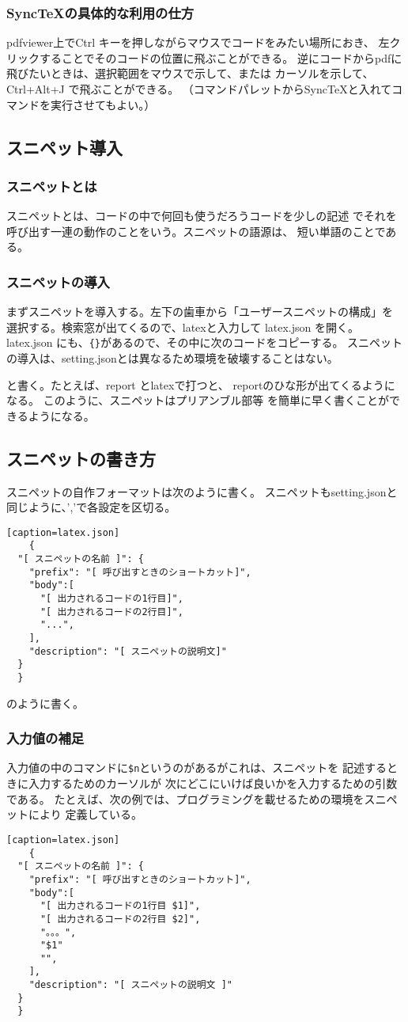 \documentclass{ltjsarticle}
\begin{document}
\subsubsection*{SyncTeXの具体的な利用の仕方}
pdfviewer上でCtrl キーを押しながらマウスでコードをみたい場所におき、
左クリックすることでそのコードの位置に飛ぶことができる。
逆にコードからpdfに飛びたいときは、選択範囲をマウスで示して、または
カーソルを示して、 Ctrl+Alt+J で飛ぶことができる。
（コマンドパレットからSyncTeXと入れてコマンドを実行させてもよい。）

\subsection{スニペット導入}
\subsubsection*{スニペットとは}
スニペットとは、コードの中で何回も使うだろうコードを少しの記述
でそれを呼び出す一連の動作のことをいう。スニペットの語源は、
短い単語のことである。
\subsubsection*{スニペットの導入}
まずスニペットを導入する。左下の歯車から「ユーザースニペットの構成」を
選択する。検索窓が出てくるので、latexと入力して latex.json を開く。
latex.json にも、\verb|{}|があるので、その中に次のコードをコピーする。
スニペットの導入は、setting.jsonとは異なるため環境を破壊することはない。



と書く。たとえば、report とlatexで打つと、
reportのひな形が出てくるようになる。
このように、スニペットはプリアンブル部等
を簡単に早く書くことができるようになる。
\subsection{スニペットの書き方}
スニペットの自作フォーマットは次のように書く。
スニペットもsetting.jsonと同じように、','で各設定を区切る。
\begin{verbatim}[caption=latex.json]
	{
  "[ スニペットの名前 ]": {
    "prefix": "[ 呼び出すときのショートカット]",
    "body":[
      "[ 出力されるコードの1行目]",
      "[ 出力されるコードの2行目]",
      "...",
    ],
    "description": "[ スニペットの説明文]"
  }
  }
\end{verbatim}
のように書く。
\subsubsection*{入力値の補足}
入力値の中のコマンドに\verb|$n|というのがあるがこれは、スニペットを
記述するときに入力するためのカーソルが
次にどこにいけば良いかを入力するための引数である。
たとえば、次の例では、プログラミングを載せるための環境をスニペットにより
定義している。
\begin{verbatim}[caption=latex.json]
	{
  "[ スニペットの名前 ]": {
    "prefix": "[ 呼び出すときのショートカット]",
    "body":[
      "[ 出力されるコードの1行目 $1]",
      "[ 出力されるコードの2行目 $2]",
      "。。。",
      "$1"
      "",
    ],
    "description": "[ スニペットの説明文 ]"
  }
  }
\end{verbatim}
\end{document}
